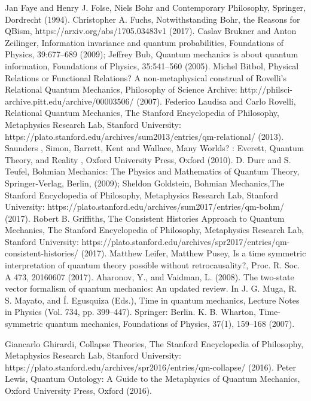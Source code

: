 \documentclass[12pt,onecolumn,preprintnumbers,amsmath,amssymbn,reprint,nofootinbib,superscriptaddress]{revtex4}    %
\begin{document}
\begin{thebibliography}{}
Jan Faye and Henry J. Folse,
Niels Bohr and Contemporary Philosophy, Springer, Dordrecht (1994).
Christopher A. Fuchs, Notwithstanding Bohr, the Reasons for QBism, https://arxiv.org/abs/1705.03483v1 (2017).
 Caslav Brukner and Anton Zeilinger, Information invariance and quantum probabilities,
Foundations of Physics, 39:677–689 (2009);
 Jeffrey Bub, Quantum mechanics is about quantum information,
Foundations of Physics, 35:541–560 (2005).
Michel Bitbol, Physical Relations or Functional Relations? A non-metaphysical construal of Rovelli's Relational Quantum Mechanics, Philosophy of Science Archive: http://philsci-archive.pitt.edu/archive/00003506/ (2007). 
 Federico Laudisa and Carlo Rovelli, Relational Quantum Mechanics, The Stanford Encyclopedia of Philosophy, Metaphysics Research Lab, Stanford University: https://plato.stanford.edu/archives/sum2013/entries/qm-relational/ (2013).
Saunders , Simon, Barrett, Kent and Wallace,  Many Worlds? : Everett, Quantum Theory, and Reality , Oxford University Press, Oxford (2010).
 D. Durr and S. Teufel,
Bohmian Mechanics: The Physics and Mathematics of Quantum Theory, Springer-Verlag, Berlin, (2009); Sheldon Goldstein, Bohmian Mechanics,The Stanford Encyclopedia of Philosophy, Metaphysics Research Lab, Stanford University: https://plato.stanford.edu/archives/sum2017/entries/qm-bohm/ (2017).
Robert B. Griffiths, The Consistent Histories Approach to Quantum Mechanics, The Stanford Encyclopedia of Philosophy, Metaphysics Research Lab, Stanford University: https://plato.stanford.edu/archives/spr2017/entries/qm-consistent-histories/ (2017).
Matthew Leifer, Matthew Pusey, Is a time symmetric interpretation of quantum theory possible without retrocausality?, Proc. R. Soc. A 473, 20160607 (2017).
 Aharonov, Y., and Vaidman, L. (2008). The two-state vector formalism of quantum mechanics: An updated review. In J. G. Muga, R. S. Mayato, and \'I. Egusquiza (Eds.), Time in quantum mechanics, Lecture Notes in Physics (Vol. 734, pp. 399–447). Springer: Berlin.
K. B. Wharton, Time-symmetric quantum mechanics, Foundations of Physics, 37(1), 159–168 (2007). 



 Giancarlo Ghirardi, Collapse Theories, The Stanford Encyclopedia of Philosophy, Metaphysics Research Lab, Stanford University: https://plato.stanford.edu/archives/spr2016/entries/qm-collapse/ (2016).
Peter Lewis, Quantum Ontology:  A Guide to the Metaphysics of Quantum Mechanics, Oxford University Press, Oxford (2016).




\end{thebibliography}
\end{document}
